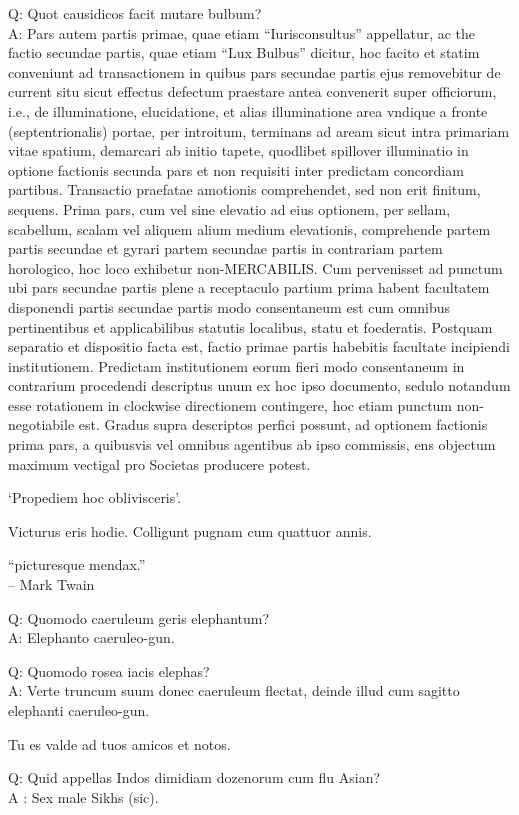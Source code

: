 \documentclass[titlepage,12pt]{memoir}
\begin{document}
Q: Quot causidicos facit mutare bulbum?\\
A: Pars autem partis primae, quae etiam “Iurisconsultus” appellatur, ac the
factio secundae partis, quae etiam “Lux Bulbus” dicitur, hoc facito et statim
conveniunt ad transactionem in quibus pars secundae partis ejus removebitur
de current situ sicut effectus defectum praestare antea convenerit
super officiorum, i.e., de illuminatione, elucidatione, et alias illuminatione
area vndique a fronte (septentrionalis) portae, per introitum, terminans
ad aream sicut intra primariam vitae spatium, demarcari ab initio
tapete, quodlibet spillover illuminatio in optione factionis
secunda pars et non requisiti inter predictam concordiam
partibus.
Transactio praefatae amotionis comprehendet, sed non erit
finitum, sequens. Prima pars, cum vel sine
elevatio ad eius optionem, per sellam, scabellum, scalam vel aliquem alium
medium elevationis, comprehende partem partis secundae et gyrari partem
secundae partis in contrariam partem horologico, hoc loco exhibetur
non-MERCABILIS. Cum pervenisset ad punctum ubi pars secundae partis
plene a receptaculo partium prima
habent facultatem disponendi partis secundae partis modo
consentaneum est cum omnibus pertinentibus et applicabilibus statutis localibus, statu et foederatis.
Postquam separatio et dispositio facta est, factio primae partis
habebitis facultate incipiendi institutionem. Predictam institutionem eorum
fieri modo consentaneum in contrarium procedendi descriptus
unum ex hoc ipso documento, sedulo notandum esse rotationem
in clockwise directionem contingere, hoc etiam punctum non- negotiabile est.
Gradus supra descriptos perfici possunt, ad optionem factionis
prima pars, a quibusvis vel omnibus agentibus ab ipso commissis, ens objectum
maximum vectigal pro Societas producere potest.

‘Propediem hoc oblivisceris’.

Victurus eris hodie. Colligunt pugnam cum quattuor annis.

“picturesque mendax.”
\\-- Mark Twain

Q: Quomodo caeruleum geris elephantum?\\
A: Elephanto caeruleo-gun.

Q: Quomodo rosea iacis elephas?\\
A: Verte truncum suum donec caeruleum flectat, deinde illud cum sagitto
elephanti caeruleo-gun.

Tu es valde ad tuos amicos et notos.

Q: Quid appellas Indos dimidiam dozenorum cum flu Asian?\\
A : Sex male Sikhs (sic).
\end{document}
